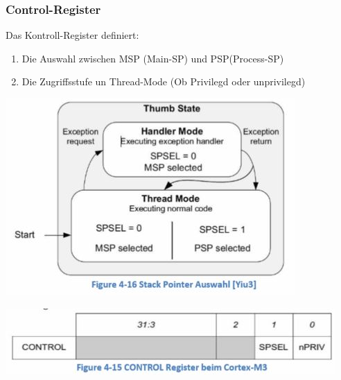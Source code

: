 \subsubsection{Control-Register}
Das Kontroll-Register definiert:
\begin{enumerate}
    \item Die Auswahl zwischen MSP (Main-SP) und PSP(Process-SP)
    \item Die Zugriffsstufe un Thread-Mode
    \subitem (Ob Privilegd oder unprivilegd)
    \end{enumerate}
    \begin{multicols}{2}
    \includegraphics[width=\linewidth]{images/StackPointerAuswahl}
    
         \includegraphics[width=\linewidth]{images/controlRegister}
             \end{multicols}